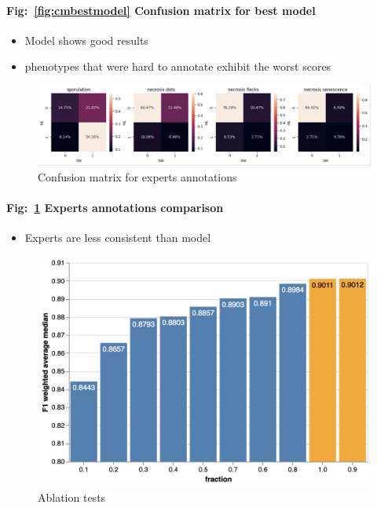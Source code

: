 \documentclass[english]{article}
\begin{document}
\paragraph{Fig:~\ref{fig:cmbestmodel} Confusion matrix for best model}
\begin{itemize}
    \item Model shows good results
    \item phenotypes that were hard to annotate exhibit the worst scores
\end{itemize}

\begin{figure}[H]
	\centering
	\includegraphics[width=0.8\linewidth]{p_viticola/2023_cdt_experts_cm.png}
	\caption{Confusion matrix for experts annotations}\label{fig:cmexpanno}
\end{figure}

\paragraph{Fig:~\ref{fig:cmexpanno} Experts annotations comparison}
\begin{itemize}
    \item Experts are less consistent than model
\end{itemize}

\begin{figure}[H]
	\centering
	\includegraphics[width=0.8\linewidth]{2023_cdt_data_frac_evolution.png}
	\caption{Ablation tests}\label{fig:ablationtests}
\end{figure}
\end{document}
